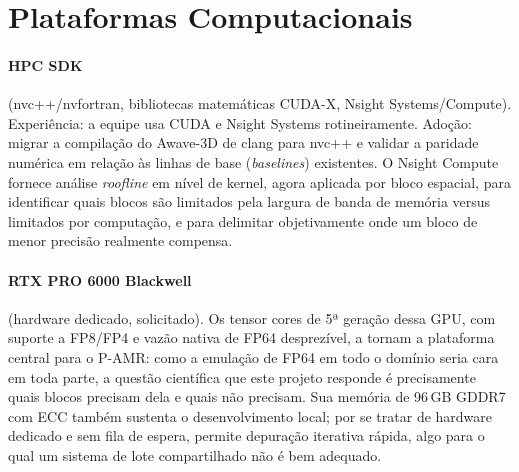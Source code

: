 \documentclass[12pt,a4paper]{article}
\newcommand{\pamr}{P\nobreakdash-AMR}
\begin{document}
\fi

\iffalse

\section{Plataformas Computacionais}

\paragraph{HPC SDK} (nvc++/nvfortran, bibliotecas matemáticas CUDA-X, Nsight
Systems/Compute). Experiência: a equipe usa CUDA e Nsight Systems
rotineiramente. Adoção: migrar a compilação do Awave-3D de clang para nvc++ e
validar a paridade numérica em relação às linhas de base (\emph{baselines})
existentes. O Nsight Compute fornece análise \emph{roofline} em nível de
kernel, agora aplicada por bloco espacial, para identificar quais blocos são
limitados pela largura de banda de memória versus limitados por computação, e
para delimitar objetivamente onde um bloco de menor precisão realmente
compensa.

\paragraph{RTX PRO 6000 Blackwell} (hardware dedicado, solicitado). Os tensor
cores de 5ª geração dessa GPU, com suporte a FP8/FP4 e vazão nativa de FP64
desprezível, a tornam a plataforma central para o \pamr{}: como a emulação de
FP64 em todo o domínio seria cara em toda parte, a questão científica que este
projeto responde é precisamente quais blocos precisam dela e quais não
precisam. Sua memória de 96\,GB GDDR7 com ECC também sustenta o
desenvolvimento local; por se tratar de hardware dedicado e sem fila de
espera, permite depuração iterativa rápida, algo para o qual um sistema de
lote compartilhado não é bem adequado.
\end{document}
